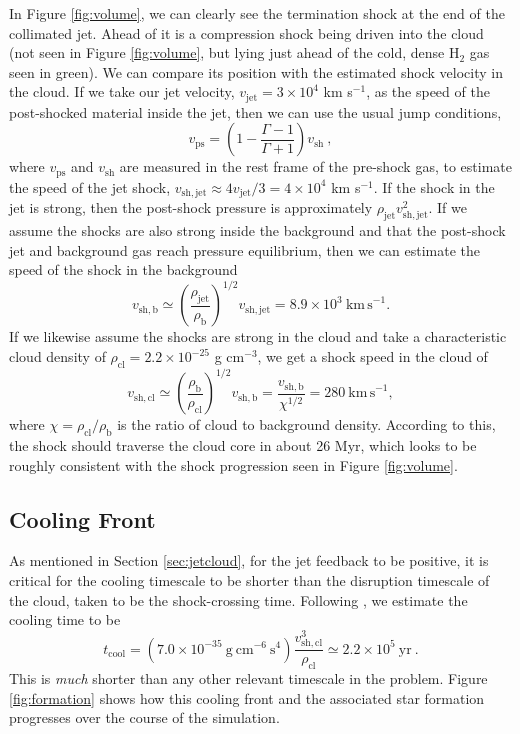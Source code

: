 \documentclass{aastex6}
\begin{document}
In Figure \ref{fig:volume}, we can clearly see the termination shock at the end of the collimated jet. Ahead of it is a compression shock being driven into the cloud (not seen in Figure \ref{fig:volume}, but lying just ahead of the cold, dense H$_2$ gas seen in green). We can compare its position with the estimated shock velocity in the cloud. If we take our jet velocity, $v_\mathrm{jet} = 3 \times 10^4$ km s$^{-1}$, as the speed of the post-shocked material inside the jet, then we can use the usual jump conditions, 
\begin{equation}
v_\mathrm{ps} = \left(1 - \frac{\Gamma-1}{\Gamma+1}\right) v_\mathrm{sh} ~,
\end{equation}
where $v_\mathrm{ps}$ and $v_\mathrm{sh}$ are measured in the rest frame of the pre-shock gas, to estimate the speed of the jet shock, $v_\mathrm{sh,jet} \approx 4 v_\mathrm{jet}/3 = 4 \times 10^4$ km s$^{-1}$. If the shock in the jet is strong, then the post-shock pressure is approximately $\rho_\mathrm{jet} v_\mathrm{sh,jet}^2$. If we assume the shocks are also strong inside the background and that the post-shock jet and background gas reach pressure equilibrium, then we can estimate the speed of the shock in the background 
\begin{equation}
v_\mathrm{sh,b} \simeq \left(\frac{\rho_\mathrm{jet}}{\rho_\mathrm{b}}\right)^{1/2} v_\mathrm{sh,jet} = 8.9 \times 10^3 ~\mathrm{km\,s}^{-1}.
\end{equation}
If we likewise assume the shocks are strong in the cloud and take a characteristic cloud density of $\rho_\mathrm{cl} = 2.2 \times 10^{-25}$ g cm$^{-3}$, we get a shock speed in the cloud of
\begin{equation}
v_\mathrm{sh,cl} \simeq \left(\frac{\rho_\mathrm{b}}{\rho_\mathrm{cl}}\right)^{1/2} v_\mathrm{sh,b} = \frac{v_\mathrm{sh,b}}{\chi^{1/2}} = 280 ~\mathrm{km\,s}^{-1},
\end{equation}
where $\chi = \rho_\mathrm{cl}/\rho_\mathrm{b}$ is the ratio of cloud to background density. According to this, the shock should traverse the cloud core in about 26 Myr, which looks to be roughly consistent with the shock progression seen in Figure \ref{fig:volume}.


\subsection{Cooling Front}
\label{sec:cooling_front}

As mentioned in Section \ref{sec:jetcloud}, for the jet feedback to be positive, it is critical for the cooling timescale to be shorter than the disruption timescale of the cloud, taken to be the shock-crossing time. Following \citet{Fragile04}, we estimate the cooling time to be
\begin{equation}
t_\mathrm{cool} = (7.0 \times 10^{-35}~\mathrm{g~cm}^{-6}~\mathrm{s}^4) \frac{v^3_\mathrm{sh,cl}}{\rho_\mathrm{cl}} \simeq 2.2 \times 10^{5}~\mathrm{yr} ~.
\end{equation}
This is {\it much} shorter than any other relevant timescale in the problem. Figure \ref{fig:formation} shows how this cooling front and the associated star formation progresses over the course of the simulation.
\end{document}
